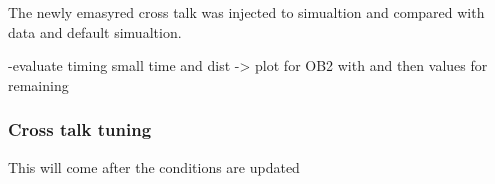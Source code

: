 The newly emasyred cross talk was injected to simualtion and compared with data and default simualtion.

-evaluate timing small time and dist ->  plot for OB2 with  and then values for remaining %




\subsubsection{Cross talk tuning}

This will come after the conditions are updated





